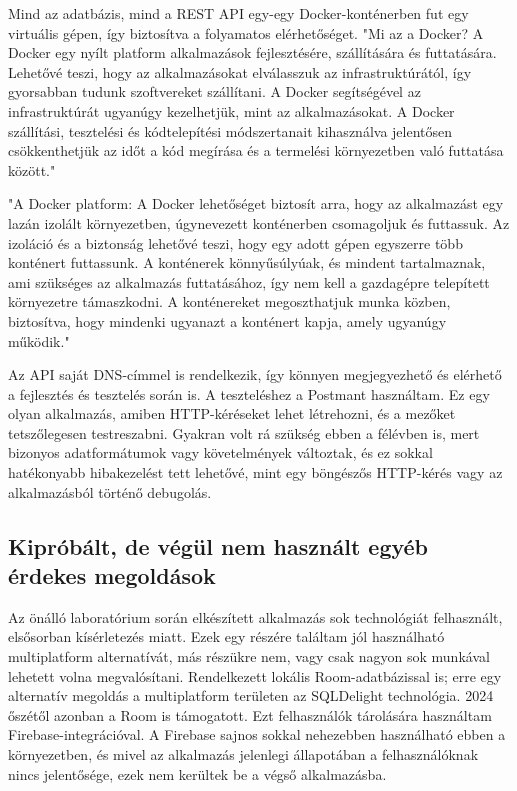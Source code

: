 Mind az adatbázis, mind a REST API egy-egy Docker-konténerben fut egy virtuális gépen, így biztosítva a folyamatos elérhetőséget.  
"Mi az a Docker? A Docker egy nyílt platform alkalmazások fejlesztésére, szállítására és futtatására. Lehetővé teszi, hogy az alkalmazásokat elválasszuk az infrastruktúrától, így gyorsabban tudunk szoftvereket szállítani. A Docker segítségével az infrastruktúrát ugyanúgy kezelhetjük, mint az alkalmazásokat. A Docker szállítási, tesztelési és kódtelepítési módszertanait kihasználva jelentősen csökkenthetjük az időt a kód megírása és a termelési környezetben való futtatása között." \cite{Docker}  

"A Docker platform: A Docker lehetőséget biztosít arra, hogy az alkalmazást egy lazán izolált környezetben, úgynevezett konténerben csomagoljuk és futtassuk. Az izoláció és a biztonság lehetővé teszi, hogy egy adott gépen egyszerre több konténert futtassunk. A konténerek könnyűsúlyúak, és mindent tartalmaznak, ami szükséges az alkalmazás futtatásához, így nem kell a gazdagépre telepített környezetre támaszkodni. A konténereket megoszthatjuk munka közben, biztosítva, hogy mindenki ugyanazt a konténert kapja, amely ugyanúgy működik." \cite{Docker}

Az API saját DNS-címmel is rendelkezik, így könnyen megjegyezhető és elérhető a fejlesztés és tesztelés során is.  
A teszteléshez a Postmant használtam. Ez egy olyan alkalmazás, amiben HTTP-kéréseket lehet létrehozni, és a mezőket tetszőlegesen testreszabni.  
Gyakran volt rá szükség ebben a félévben is, mert bizonyos adatformátumok vagy követelmények változtak, és ez sokkal hatékonyabb hibakezelést tett lehetővé, mint egy böngészős HTTP-kérés vagy az alkalmazásból történő debugolás.

\subsection{Kipróbált, de végül nem használt egyéb érdekes megoldások}

Az önálló laboratórium során elkészített alkalmazás sok technológiát felhasznált, elsősorban kísérletezés miatt.  
Ezek egy részére találtam jól használható multiplatform alternatívát, más részükre nem, vagy csak nagyon sok munkával lehetett volna megvalósítani.  
Rendelkezett lokális Room-adatbázissal is; erre egy alternatív megoldás a multiplatform területen az SQLDelight technológia. 2024 őszétől azonban a Room is támogatott.  
Ezt felhasználók tárolására használtam Firebase-integrációval. A Firebase sajnos sokkal nehezebben használható ebben a környezetben, és mivel az alkalmazás jelenlegi állapotában a felhasználóknak nincs jelentősége, ezek nem kerültek be a végső alkalmazásba.

